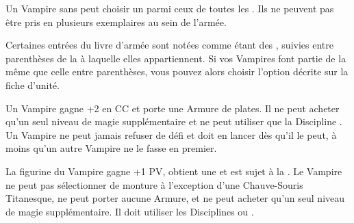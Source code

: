 
Un Vampire sans \bloodline peut choisir un \thinbloodpower parmi ceux de toutes les \bloodlines. Ils ne peuvent pas être pris en plusieurs exemplaires au sein de l'armée.


Certaines entrées du livre d'armée sont notées comme étant des \bloodlineunits{}, suivies entre parenthèses de la \bloodline à laquelle elles appartiennent. Si vos Vampires font partie de la même \bloodline que celle entre parenthèses, vous pouvez alors choisir l'option décrite sur la fiche d'unité.


Un Vampire \blooddrake gagne +2 en CC et porte une Armure de plates. Il ne peut acheter qu'un seul niveau de magie supplémentaire et ne peut utiliser que la Discipline \necromancy . Un Vampire \blooddrake ne peut jamais refuser de défi et doit en lancer dès qu'il le peut, à moins qu'un autre Vampire \blooddrake ne le fasse en premier.

\begin{customitemize}
	\item {}

	\item {}

	\item {}
\end{customitemize}


La figurine du Vampire \strigoi gagne +1 PV, obtient une  et est sujet à la \hatred . Le Vampire ne peut pas sélectionner de monture à l'exception d'une Chauve-Souris Titanesque, ne peut porter aucune Armure, et ne peut acheter qu'un seul niveau de magie supplémentaire. Il doit utiliser les Disciplines \wilderness ou \necromancy . 

